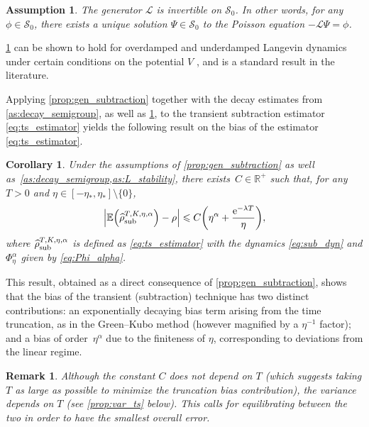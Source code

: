 \documentclass[11pt]{article}
\newcommand{\E}{\mathbb{E}}
\newcommand{\R}{\mathbb{R}}
\newcommand{\e}{\mathrm{e}}
\renewcommand{\L}{\mathcal{L}}
\renewcommand{\S}{\mathscr{S}}
\renewcommand{\leq}{\leqslant}
\DeclarePairedDelimiter\paren{\lparen}{\rparen}
\newtheorem{corollary}{Corollary}
\newtheorem{assumption}{Assumption}
\newtheorem{remark}{Remark}
\theoremstyle{definition}
\newcommand{\estTmp}{\widehat{\rho}}
\newcommand{\aTSest}{\estTmp^{T,K,\eta,\alpha}_{\rm sub}} %
\begin{document}
\begin{assumption}
\label{as:L_stability}
The generator $\L$ is invertible on $\S_0$. In other words, for any $\phi\in\S_0$, there exists a unique solution $\Psi \in \S_0$ to the Poisson equation $-\L\Psi = \phi$.
\end{assumption}

\cref{as:L_stability} can be shown to hold for overdamped and underdamped Langevin dynamics under certain conditions on the potential $V$ \cite{talay2002,kopec2014,kopec2015}, and is a standard result in the literature.

Applying \cref{prop:gen_subtraction} together with the decay estimates from \cref{as:decay_semigroup}, as well as \cref{as:L_stability}, to the transient subtraction estimator \eqref{eq:ts_estimator} yields the following result on the bias of the estimator \eqref{eq:ts_estimator}.

\begin{corollary}
\label{cor:gk_equiv}
Under the assumptions of \cref{prop:gen_subtraction} as well as~\cref{as:decay_semigroup,as:L_stability}, there exists~$C\in\R^+$ such that, for any $T>0$ and $\eta \in [-\eta_*, \eta_*] \setminus \{0\}$,
\begin{equation}
    \notag
	\left|\E\paren*{\aTSest} - \rho\right| \leq C\paren*{\eta^\alpha + \frac{\e^{-\lambda T}}{\eta}},
\label{eq:gk_cor_statement}
\end{equation}
where $\aTSest$ is defined as \eqref{eq:ts_estimator} with the dynamics \eqref{eq:sub_dyn} and $\Phi_\eta^\alpha$ given by \eqref{eq:Phi_alpha}.
\end{corollary}

This result, obtained as a direct consequence of \cref{prop:gen_subtraction}, shows that the bias of the transient (subtraction) technique has two distinct contributions: an exponentially decaying bias term arising from the time truncation, as in the Green--Kubo method (however magnified by a $\eta^{-1}$ factor); and a bias of order~$\eta^\alpha$ due to the finiteness of $\eta$, corresponding to deviations from the linear regime.

\begin{remark}
	Although the constant $C$ does not depend on $T$ (which suggests taking $T$ as large as possible to minimize the truncation bias contribution), the variance depends on $T$ (see \cref{prop:var_ts} below). This calls for equilibrating between the two in order to have the smallest overall error.
\end{remark}
\end{document}
